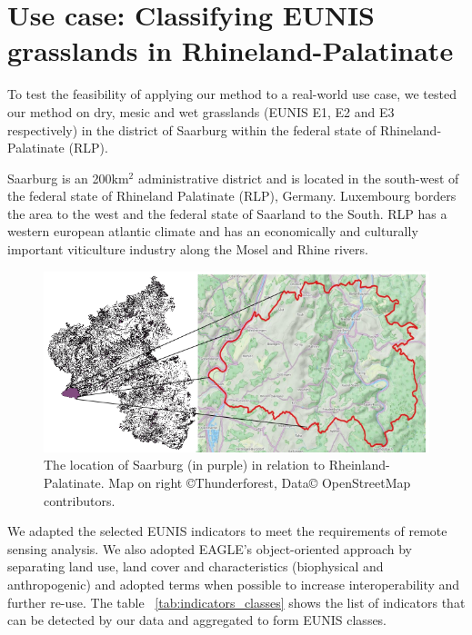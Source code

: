 \documentclass[authoryear, review,12pt,number]{elsarticle}
\begin{document}
\section{Use case: Classifying EUNIS grasslands in Rhineland-Palatinate}
\label{sec:usecase_data}
To test the feasibility of applying our method to a real-world use case, we 
tested our method on dry, mesic and wet grasslands (EUNIS E1, E2 and E3 
respectively) in the district of Saarburg within the federal state of 
Rhineland-Palatinate (RLP). 

Saarburg is an 200km$^{2}$ administrative district and is located in the
south-west of the federal state of Rhineland Palatinate (RLP), Germany.
Luxembourg borders the area to the west and the federal state of Saarland to
the South. RLP has a western european atlantic climate and has an economically
and culturally important viticulture industry along the Mosel and Rhine rivers.
\begin{figure}
\label{fig:study_area}
    \includegraphics[width=\textwidth]{diagrams/study_area_closeup.png}
    \caption{The location of Saarburg (in purple) in relation to
    Rheinland-Palatinate. Map on right \copyright Thunderforest, Data\copyright
    OpenStreetMap contributors.}
\end{figure}
We adapted the selected EUNIS indicators to meet the requirements of remote
sensing analysis. We also adopted EAGLE's object-oriented approach by separating
land use, land cover and characteristics (biophysical and anthropogenic) and
adopted terms when possible to increase interoperability and further re-use.
The table ~\ref{tab:indicators_classes} shows the list of indicators that can be
detected by our data and aggregated to form EUNIS classes. 
\end{document}
